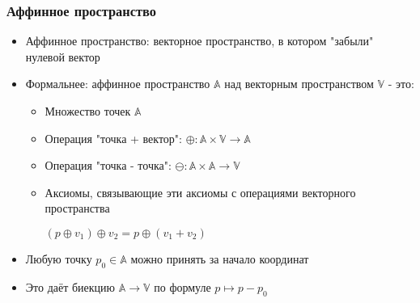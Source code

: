 \documentclass{beamer}
\begin{document}
\begin{frame}[fragile]
\frametitle{Аффинное пространство}
\begin{itemize}
\item Аффинное пространство: векторное пространство, в котором "забыли" нулевой вектор
\pause
\item Формальнее: аффинное пространство \begin{math}\mathbb A\end{math} над векторным пространством \begin{math}\mathbb V\end{math} - это:
\pause
\begin{itemize}
\item Множество точек \begin{math}\mathbb A\end{math}
\pause
\item Операция "точка + вектор": \begin{math}\oplus: \mathbb A \times \mathbb V \rightarrow \mathbb A\end{math}
\pause
\item Операция "точка - точка": \begin{math}\ominus: \mathbb A \times \mathbb A \rightarrow \mathbb V\end{math}
\pause
\item Аксиомы, связывающие эти аксиомы с операциями векторного пространства

\begin{math}(p\oplus v_1)\oplus v_2 = p\oplus(v_1+v_2)\end{math}
\end{itemize}
\pause
\item Любую точку \begin{math}p_0\in \mathbb A\end{math} можно принять за начало координат
\item Это даёт биекцию \begin{math}\mathbb A \rightarrow \mathbb V\end{math} по формуле \begin{math}p \mapsto p - p_0\end{math}
\end{itemize}
\end{frame}
\end{document}
